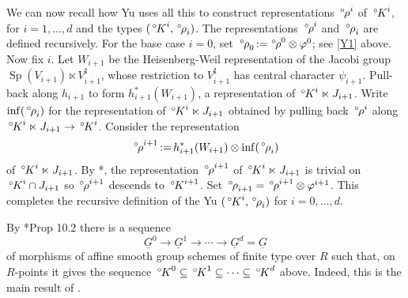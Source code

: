 \documentclass[10pt]{amsart}
\makeatletter
\theoremstyle{plain}
\theoremstyle{definition}
\DeclareMathOperator{\trace}{Tr}
\newcommand{\ceq}{{\, :=\, }}
\newcommand{\labitem}[2]{
\def\@itemlabel{\textbf{#1}}
\item
\def\@currentlabel{#1}\label{#2}}
\newcommand{\Sp}{{\operatorname{Sp}}}
\newcommand{\oK}{{\,^\circ \hskip-1pt K}}
\newcommand{\orho}{{\,^\circ \hskip-1pt \rho}}
\makeatother
\begin{document}
We can now recall how Yu uses all this to construct representations $\orho^i$ of $\oK^i$, for $i=1, \ldots, d$ and the types $(\oK^i,\orho_i)$.
The representations $\orho^i$ and $\orho_i$ are defined recursively.
For the base case $i=0$, set $\orho_0 \ceq \orho^0\otimes \varphi^0$; see \ref{Y1} above.
Now fix $i$.
Let $W_{i+1}$ be the Heisenberg-Weil representation of the Jacobi group $\Sp(V_{i+1})\ltimes V_{i+1}^\sharp$, whose restriction to $V_{i+1}^\sharp$ has central character $\psi_{i+1}$.
Pull-back along $h_{i+1}$ to form $h_{i+1}^*(W_{i+1})$, a representation of $\oK^i \ltimes J_{i+1}$.
Write $\inf(\orho_i)$ for the representation of $\oK^i \ltimes J_{i+1}$ obtained by pulling back $\orho^i$ along $\oK^i \ltimes J_{i+1} \to \oK^i$. 
Consider the representation
\begin{equation}\label{eq:tensor}
\orho^{i+1} \ceq h_{i+1}^*(W_{i+1}) \otimes \inf(\orho_i)
\end{equation}
of $\oK^i \ltimes J_{i+1}$.
By \cite{yu:01a}*{}, the representation $\orho^{i+1}$ of $\oK^i \ltimes J_{i+1}$ is trivial on $\oK^{i}\cap J_{i+1}$ so $\orho^{i+1}$ descends to $\oK^{i+1}$. 
%
Set $\orho_{i+1} = \orho^{i+1}\otimes \varphi^{i+1}$.
This completes the recursive definition of the Yu $(\oK^i,\orho_i)$ for $i=0, \ldots , d$.



By \cite{Yu:models}*{Prop 10.2} there is a sequence  
\[
\underline{G}^0 \to \underline{G}^1 \to \cdots \to \underline{G}^d = \underline{G}
\]
of morphisms of affine smooth group schemes of finite type over $R$ such that, on $R$-points it gives the sequence $\oK^0 \subseteq \oK^1 \subseteq \cdots \subseteq \oK^d$ above.
Indeed, this is the main result of \cite{Yu:models}.
\end{document}
